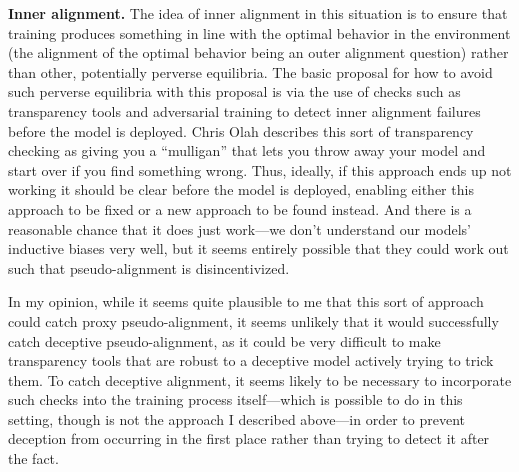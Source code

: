 \textbf{Inner alignment.} The idea of inner alignment in this situation is to ensure that training produces something in line with the optimal behavior in the environment (the alignment of the optimal behavior being an outer alignment question) rather than other, potentially perverse equilibria. The basic proposal for how to avoid such perverse equilibria with this proposal is via the use of checks such as transparency tools and adversarial training to detect inner alignment failures before the model is deployed. Chris Olah describes\cite{TODO: cite https://www.alignmentforum.org/posts/X2i9dQQK3gETCyqh2/chris-olah-s-views-on-agi-safety} this sort of transparency checking as giving you a ``mulligan'' that lets you throw away your model and start over if you find something wrong. Thus, ideally, if this approach ends up not working it should be clear before the model is deployed, enabling either this approach to be fixed or a new approach to be found instead. And there is a reasonable chance that it does just work---we don't understand our models' inductive biases very well, but it seems entirely possible that they could work out such that pseudo-alignment\cite{TODO: cite https://www.alignmentforum.org/s/r9tYkB2a8Fp4DN8yB/p/FkgsxrGf3QxhfLWHG} is disincentivized.

In my opinion, while it seems quite plausible to me that this sort of approach could catch proxy pseudo-alignment\cite{TODO: cite https://www.alignmentforum.org/posts/pL56xPoniLvtMDQ4J/the-inner-alignment-problem}, it seems unlikely that it would successfully catch deceptive pseudo-alignment\cite{TODO: cite https://www.alignmentforum.org/posts/zthDPAjh9w6Ytbeks/deceptive-alignment}, as it could be very difficult to make transparency tools that are robust to a deceptive model actively trying to trick them. To catch deceptive alignment, it seems likely to be necessary to incorporate such checks into the training process itself---which is possible to do in this setting, though is not the approach I described above---in order to prevent deception from occurring in the first place rather than trying to detect it after the fact.

